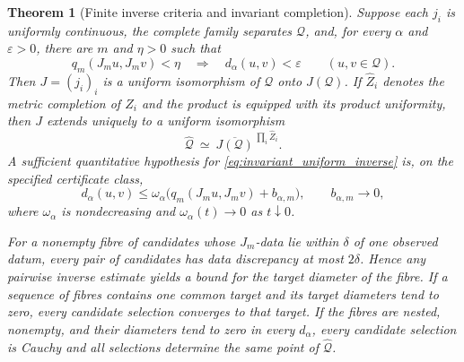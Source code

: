 \documentclass[11pt,a4paper]{amsart}
\numberwithin{equation}{section}
\newtheorem{theorem}{Theorem}[section]
\theoremstyle{definition}
\theoremstyle{remark}
\begin{document}
\begin{theorem}[Finite inverse criteria and invariant completion]\label{thm:invariant_uniform}
Suppose each $j_i$ is uniformly continuous, the complete family separates $\mathcal Q$, and, for every $\alpha$ and $\varepsilon>0$, there are $m$ and $\eta>0$ such that
\begin{equation}\label{eq:invariant_uniform_inverse}
 q_m(J_mu,J_mv)<\eta\quad\Longrightarrow\quad
 d_\alpha(u,v)<\varepsilon\qquad(u,v\in\mathcal Q).
\end{equation}
Then $J=(j_i)_i$ is a uniform isomorphism of $\mathcal Q$ onto $J(\mathcal Q)$. If $\widehat Z_i$ denotes the metric completion of $Z_i$ and the product is equipped with its product uniformity, then $J$ extends uniquely to a uniform isomorphism
\begin{equation}\label{eq:invariant_completion_iso}
 \widehat{\mathcal Q}\ \simeq\
 \overline{J(\mathcal Q)}^{\,\prod_i\widehat Z_i}.
\end{equation}
A sufficient quantitative hypothesis for \eqref{eq:invariant_uniform_inverse} is, on the specified certificate class,
\begin{equation}\label{eq:invariant_inverse_tail}
 d_\alpha(u,v)\le\omega_\alpha\!\big(q_{m}(J_mu,J_mv)+b_{\alpha,m}\big),
 \qquad b_{\alpha,m}\longrightarrow0,
\end{equation}
where $\omega_\alpha$ is nondecreasing and $\omega_\alpha(t)\to0$ as $t\downarrow0$.

For a nonempty fibre of candidates whose $J_m$-data lie within $\delta$ of one observed datum, every pair of candidates has data discrepancy at most $2\delta$. Hence any pairwise inverse estimate yields a bound for the target diameter of the fibre. If a sequence of fibres contains one common target and its target diameters tend to zero, every candidate selection converges to that target. If the fibres are nested, nonempty, and their diameters tend to zero in every $d_\alpha$, every candidate selection is Cauchy and all selections determine the same point of $\widehat{\mathcal Q}$.
\end{theorem}
\end{document}
